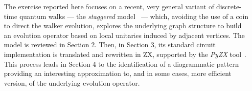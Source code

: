 The exercise reported here focuses on a recent, very general variant of discrete-time quantum walks --- the \emph{staggered}
 model~\cite{Portugal_2017,PortugalSFG16} --- which, avoiding the use of a coin to direct the walker evolution, explores the underlying graph structure to build an evolution operator based on local unitaries induced by adjacent vertices.  The model is reviewed in Section 2. Then, in Section 3, its standard circuit implementation is translated and rewritten in ZX, supported by  the \textit{PyZX} tool~\cite{pyzx}. This process leads in Section 4 to the identification of a diagrammatic pattern providing an interesting approximation to, and in some cases,  more efficient version, of the underlying evolution operator.  



